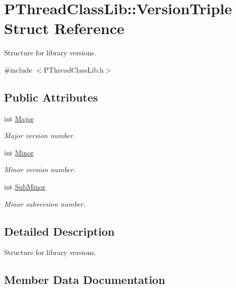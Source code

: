 \hypertarget{structPThreadClassLib_1_1VersionTriple}{}\section{P\+Thread\+Class\+Lib\+:\+:Version\+Triple Struct Reference}
\label{structPThreadClassLib_1_1VersionTriple}


Structure for library versions.  




{\ttfamily \#include $<$P\+Thread\+Class\+Lib.\+h$>$}

\subsection*{Public Attributes}
\begin{DoxyCompactItemize}
\item 
int \hyperlink{structPThreadClassLib_1_1VersionTriple_ab34a8a6d82b1b4cc6dd3e2e515a3176f}{Major}
\begin{DoxyCompactList}\small\item\em Major version number. \end{DoxyCompactList}\item 
int \hyperlink{structPThreadClassLib_1_1VersionTriple_ad937fe83d89788c30241f937bb8ddb37}{Minor}
\begin{DoxyCompactList}\small\item\em Minor version number. \end{DoxyCompactList}\item 
int \hyperlink{structPThreadClassLib_1_1VersionTriple_a51341849d79f4a8077291a4502fb4840}{Sub\+Minor}
\begin{DoxyCompactList}\small\item\em Minor subversion number. \end{DoxyCompactList}\end{DoxyCompactItemize}


\subsection{Detailed Description}
Structure for library versions. 

\subsection{Member Data Documentation}
\mbox{\label{structPThreadClassLib_1_1VersionTriple_ab34a8a6d82b1b4cc6dd3e2e515a3176f}} 
